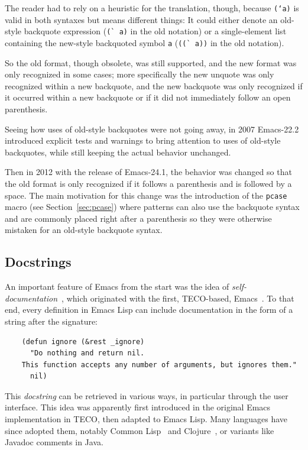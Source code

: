 \documentclass[format=acmsmall, review]{acmart}
\newcommand \Elisp {Emacs Lisp}
\begin{document}
The reader had to rely on a heuristic for the translation, though,
because \texttt{(`a)} is valid in both syntaxes but means different
things: It could either denote an old-style backquote expression
(\verb|(` a)| in the old notation) or a single-element list containing
the new-style backquoted symbol \texttt{a} (\verb|((` a))| in the old
notation).

So the old format, though obsolete, was still supported, and the
new format was only recognized in some cases; more specifically the new
unquote was only recognized within a new backquote, and the new
backquote was only recognized if it occurred within a new backquote or
if it did not immediately follow an open parenthesis.

Seeing how uses of old-style backquotes were not going away, in 2007
Emacs-22.2 introduced explicit tests and warnings to bring attention to uses
of old-style backquotes, while still keeping the actual behavior unchanged.

Then in 2012 with the release of Emacs-24.1, the behavior was changed so
that the old format is only recognized if it follows a parenthesis and is
followed by a space.  The main motivation for this change was the
introduction of the \texttt{pcase} macro (see Section~\ref{sec:pcase}) where patterns can also use the
backquote syntax and are commonly placed right after a parenthesis so they
were otherwise mistaken for an old-style backquote syntax.


\subsection{Docstrings}
\label{sec:docstrings}

An important feature of Emacs from the start was the idea of
\emph{self-documentation}~\cite{Stallman1981}, which originated with
the first, TECO-based, Emacs~\cite{Stallman2018-personal}.  To that end, every
definition in \Elisp{} can include documentation in the form of a
string after the signature:
\begin{verbatim}
    (defun ignore (&rest _ignore)
      "Do nothing and return nil.
    This function accepts any number of arguments, but ignores them."
      nil)
\end{verbatim}
This \emph{docstring} can be retrieved in various ways, in particular
through the user interface.  This idea was apparently first introduced in
the original Emacs implementation in TECO, then adapted to \Elisp{}.
Many languages have since adopted them, notably Common
Lisp~\cite{HyperSpec} and Clojure~\cite{ClojureDotOrg}, or variants like
Javadoc comments in Java.
\end{document}
